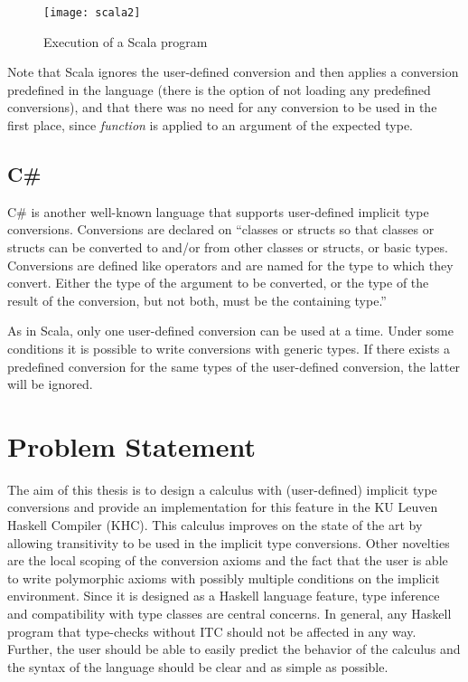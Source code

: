 \begin{figure}
  \centering
  
  \texttt{[image: scala2]}
  \caption{Execution of a Scala program}
  \label{scala}
\end{figure}
Note that Scala ignores the user-defined conversion and then applies a conversion predefined in the language (there is the option of not loading any predefined conversions), and that there was no need for any conversion to be used in the first place, since \textit{function} is applied to an argument of the expected type.
\subsection{C\#}
C\# \cite{csharp} is another well-known language that supports user-defined implicit type conversions. Conversions are declared on ``classes or structs so that classes or structs can be converted to and/or from other classes or structs, or basic types. Conversions are defined like operators and are named for the type to which they convert. Either the type of the argument to be converted, or the type of the result of the conversion, but not both, must be the containing type.''

As in Scala, only one user-defined conversion can be used at a time. Under some conditions it is possible to write conversions with generic types. If there exists a predefined conversion for the same types of the user-defined conversion, the latter will be ignored.
\section{Problem Statement}
\label{problem}
The aim of this thesis is to design a calculus with (user-defined) implicit type conversions and provide an implementation for this feature in the KU Leuven Haskell Compiler (KHC). This calculus improves on the state of the art by allowing transitivity to be used in the implicit type conversions. Other novelties are the local scoping of the conversion axioms and the fact that the user is able to write polymorphic axioms with possibly multiple conditions on the implicit environment. 
Since it is designed as a Haskell language feature, type inference and compatibility with type classes are central concerns. In general, any Haskell program that type-checks without ITC should not be affected in any way. Further, the user should be able to easily predict the behavior of the calculus and the syntax of the language should be clear and as simple as possible.

